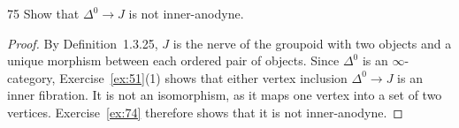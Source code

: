 \begin{exercise}{75}
Show that $\Delta^0\to J$ is not inner-anodyne.

\begin{proof}
By Definition~1.3.25, $J$ is the nerve of the groupoid
with two objects and a unique morphism between each
ordered pair of objects.
Since $\Delta^0$ is an $\infty$-category,
Exercise~\ref{ex:51}(1) shows that either vertex
inclusion $\Delta^0\to J$ is an inner fibration.
It is not an isomorphism, as it maps one vertex into
a set of two vertices.
Exercise~\ref{ex:74} therefore shows that it is not
inner-anodyne.
\end{proof}
\end{exercise}
